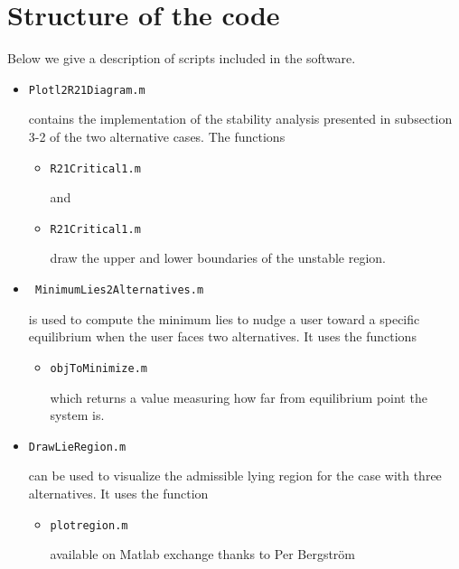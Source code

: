 \documentclass[english]{article}
\begin{document}
\section{Structure of the code}
Below we give a description of scripts included in the software.
\begin{itemize}
\item \begin{verbatim}Plotl2R21Diagram.m\end{verbatim}
contains the implementation of the stability analysis presented in subsection 3-2 of the two alternative cases.
The functions
\begin{itemize}
\item \begin{verbatim}R21Critical1.m\end{verbatim} and
\item \begin{verbatim}R21Critical1.m\end{verbatim}
draw the upper and lower boundaries of the unstable region.
\end{itemize}


\item \begin{verbatim} MinimumLies2Alternatives.m\end{verbatim} is used to compute the minimum lies to nudge a user toward a specific equilibrium when the user faces two alternatives. It uses the functions
\begin{itemize}
\item \begin{verbatim}objToMinimize.m\end{verbatim} which returns a value measuring how far from equilibrium point the system is.
\end{itemize}


\item \begin{verbatim}DrawLieRegion.m\end{verbatim} can be used to visualize the admissible lying region for the case with three alternatives. It uses the function
\begin{itemize}
\item \begin{verbatim}plotregion.m \end{verbatim} available on Matlab exchange thanks to  Per Bergström
\end{itemize}




\end{itemize}
\end{document}
